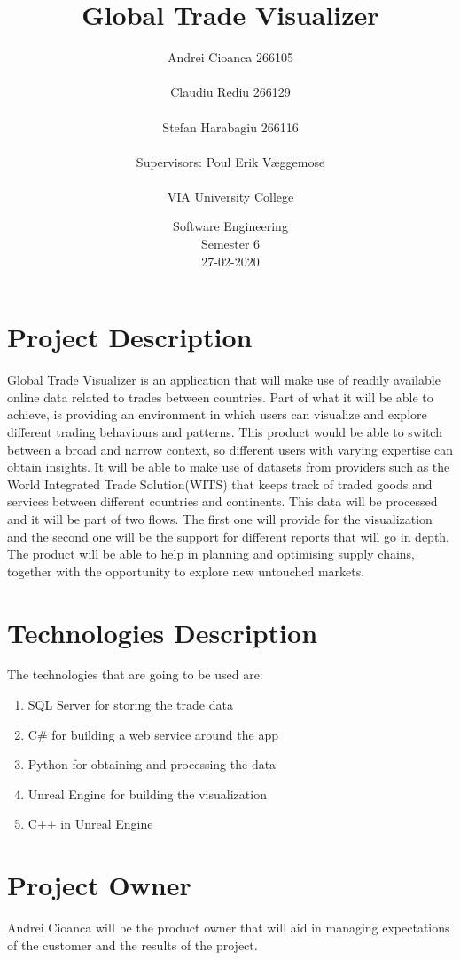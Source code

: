 \documentclass{article}
\title{\Huge Global Trade Visualizer}
\date{Software Engineering \\  Semester 6 \\  27-02-2020}
\author{Andrei Cioanca 266105 \\ \\ Claudiu Rediu 266129 \\ \\ Stefan Harabagiu 266116 \\ \\  Supervisors: Poul Erik Væggemose\\ \\ VIA University College}
\begin{document}
	\maketitle
	\newpage
	\tableofcontents
	\newpage
	\section{Project Description}
	Global Trade Visualizer is an application that will make use of readily available online data related to trades between countries. Part of what it will be able to achieve, is providing an environment in which users can visualize and explore different trading behaviours and patterns. This product would be able to switch between a broad and narrow context, so different users with varying expertise can obtain insights.\newline
	It will be able to make use of datasets from providers such as the World Integrated Trade Solution(WITS) that keeps track of traded goods and services between different countries and continents. This data will be processed and it will be part of two flows. The first one will provide for the visualization and the second one will be the support for different reports that will go in depth.\newline
	The product will be able to help in planning and optimising supply chains, together with the opportunity to explore new untouched markets.
	\section{Technologies Description}
	The technologies that are going to be used are:
	\begin{enumerate}
		\item SQL Server for storing the trade data
		\item C\# for building a web service around the app
		\item Python for obtaining and processing the data
		\item Unreal Engine for building the visualization
		\item C++ in Unreal Engine
	\end{enumerate}
	\section{Project Owner}
	Andrei Cioanca will be the product owner that will aid in managing expectations of the customer and the results of the project.
\end{document}
